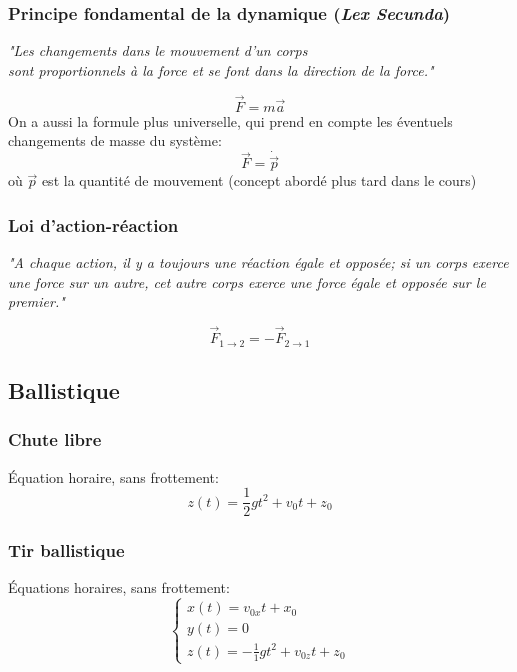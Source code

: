 \documentclass{article}
\numberwithin{equation}{section}
\begin{document}
\subsubsection{Principe fondamental de la dynamique (\emph{Lex Secunda})}
\begin{center}
	\emph{"Les changements dans le mouvement d'un corps \\ sont proportionnels à la force et se font dans la direction de la force."}
\end{center}
\begin{equation} \label{eq:lexsecunda}
	\boxed{\vec F = m \vec a}
\end{equation}
On a aussi la formule plus universelle, qui prend en compte les éventuels changements de masse du système:
\begin{equation*}
	\vec F = \dot{\vec{p}}
\end{equation*}
où \(\vec p\) est la quantité de mouvement (concept abordé plus tard dans le cours) %

\subsubsection{Loi d'action-réaction}
\begin{center}
	\emph{"A chaque action, il y a toujours une réaction égale et opposée; si un corps exerce une force sur un autre, cet autre corps exerce une force égale et opposée sur le premier."}
\end{center}
\begin{equation}
	\boxed{\vec F_{1 \to 2} = - \vec F_{2 \to 1}}
\end{equation}

\subsection{Ballistique}
\subsubsection{Chute libre}
Équation horaire, sans frottement:
\begin{equation}
	\boxed{z(t) = \frac{1}{2} gt^2 + v_0t + z_0}
\end{equation}

\subsubsection{Tir ballistique}
Équations horaires, sans frottement:
\begin{equation}
	\boxed{\begin{cases}
		x(t) = v_{0x}t + x_0 \\
		y(t) = 0 \\
		z(t) = -\frac{1}{1}gt^2 + v_{0z}t + z_0
	\end{cases}}
\end{equation}
\end{document}
